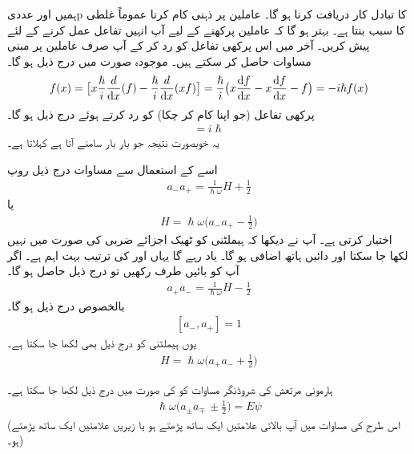 ہمیں  اور  عددی{p} کا تبادل کار دریافت کرنا ہو گا۔  عاملین پر ذہنی  کام کرنا  عموماً غلطی کا سبب بنتا ہے۔ بہتر ہو گا کہ  عاملین پرکھنے کے لیے آپ انہیں تفاعل  عمل کرنے کے لئے پیش کریں۔ آخر میں اس پرکھی تفاعل کو رد کر کے آپ صرف عاملین پر مبنی مساوات حاصل کر سکتے ہیں۔ موجودہ صورت میں درج ذیل ہو گا۔
\begin{align}
[x,p]f(x)=\big[x\frac{\hslash}{i}\frac{d}{\dif{x}}(f)-\frac{\hslash}{i}\frac{d}{\dif{x}}(xf)\big ]=\frac{\hslash}{i}\big (x\frac{\dif{f}}{\dif{x}}-x\frac{\dif{f}}{\dif{x}}-f\big )=-i\hslash f(x)
\end{align}
پرکھی تفاعل (جو اپنا کام کر چکا) کو رد کرتے ہوئے درج ذیل ہو گا۔
\begin{align}
[x,p]=i\hslash
\end{align}
یہ خوبصورت نتیجہ جو بار بار سامنے آتا ہے  کہلاتا ہے۔

اسے کے استعمال سے مساوات  درج ذیل روپ  
\begin{align}
a_{-}a_{+}=\frac{1}{\hslash\omega}H+\frac{1}{2}
\end{align}
یا
\begin{align}
H=\hslash\omega\big (a_{-}a_{+}-\frac{1}{2} \big )
\end{align}
اختیار کرتی ہے۔ آپ نے دیکھا کہ ہیملٹنی کو ٹھیک اجزائے ضربی کی صورت میں نہیں لکھا جا سکتا  اور دائیں ہاتھ اضافی  ہو گا۔ یاد رہے گا یہاں  اور  کی ترتیب بہت اہم ہے۔ اگر آپ  کو بائیں طرف رکھیں تو درج ذیل حاصل ہو گا۔
\begin{align}
a_{+}a_{-}=\frac{1}{\hslash\omega}H-\frac{1}{2}
\end{align}
بالخصوص درج ذیل ہو گا۔
\begin{align}\label{مساوات_شروڈنگر_سیڑھی_ضرب_برابر_اکائی}
[a_{-},a_{+}]=1
\end{align}
یوں ہیملٹنی کو درج ذیل بھی لکھا جا سکتا ہے۔
\begin{align}
H=\hslash\omega\big (a_{+}a_{-}+\frac{1}{2}\big )
\end{align}


ہارمونی مرتعش کی شروڈنگر مساوات کو  کی صورت میں  درج ذیل لکھا جا سکتا ہے۔
\begin{align}\label{مساوات_شروڈنگر_عوامل_روپ}
 \hslash \omega \big(a_{\pm} a_{\mp} \,\pm \frac{1}{2}\big)=E\psi  		
\end{align}
(اس  طرح کی مساوات میں آپ بالائی علامتیں ایک ساتھ پڑھتے ہو یا زیریں علامتیں ایک ساتھ پڑھتے ہو۔)

